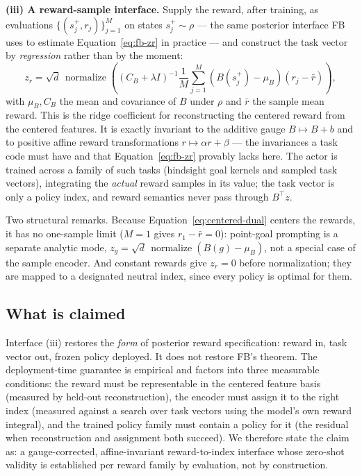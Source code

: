 \documentclass[11pt]{article}
\begin{document}
{\textbf{(iii) A reward-sample interface.}
Supply the reward, after training, as evaluations $\{(s_j^+, r_j)\}_{j=1}^{M}$ on states $s_j^+ \sim \rho$ --- the same posterior interface FB uses to estimate Equation~\eqref{eq:fb-zr} in practice --- and construct the task vector by \emph{regression} rather than by the moment:
\begin{equation}
\boxed{
    z_r
    =
    \sqrt d\,\operatorname{normalize}\!\left(
    \left( C_B + \lambda I \right)^{-1}
    \frac1M \sum_{j=1}^{M}
    \left( B(s_j^+) - \mu_B \right)\left( r_j - \bar r \right)
    \right),
}
\label{eq:centered-dual}
\end{equation}
with $\mu_B, C_B$ the mean and covariance of $B$ under $\rho$ and $\bar r$ the sample mean reward.
This is the ridge coefficient for reconstructing the centered reward from the centered features.
It is exactly invariant to the additive gauge $B \mapsto B+b$ and to positive affine reward transformations $r \mapsto \alpha r + \beta$ --- the invariances a task code must have and that Equation~\eqref{eq:fb-zr} provably lacks here.
The actor is trained across a family of such tasks (hindsight goal kernels and sampled task vectors), integrating the \emph{actual} reward samples in its value; the task vector is only a policy index, and reward semantics never pass through $B^\top z$.

Two structural remarks.
Because Equation~\eqref{eq:centered-dual} centers the rewards, it has no one-sample limit ($M=1$ gives $r_1 - \bar r = 0$): point-goal prompting is a separate analytic mode, $z_g = \sqrt d\,\operatorname{normalize}(B(g) - \mu_B)$, not a special case of the sample encoder.
And constant rewards give $z_r = 0$ before normalization; they are mapped to a designated neutral index, since every policy is optimal for them.

\subsection*{What is claimed}

Interface (iii) restores the \emph{form} of posterior reward specification: reward in, task vector out, frozen policy deployed.
It does not restore FB's theorem.
The deployment-time guarantee is empirical and factors into three measurable conditions: the reward must be representable in the centered feature basis (measured by held-out reconstruction), the encoder must assign it to the right index (measured against a search over task vectors using the model's own reward integral), and the trained policy family must contain a policy for it (the residual when reconstruction and assignment both succeed).
We therefore state the claim as: a gauge-corrected, affine-invariant reward-to-index interface whose zero-shot validity is established per reward family by evaluation, not by construction.

}
\end{document}
